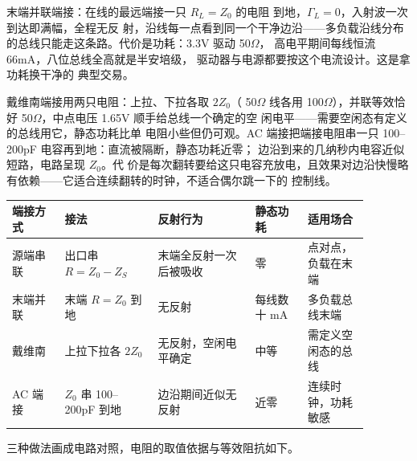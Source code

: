 末端并联端接：在线的最远端接一只 $R_L=Z_0$ 的电阻
到地，$\Gamma_L=0$，入射波一次到达即满幅，全程无反
射，沿线每一点看到同一个干净边沿——多负载沿线分布
的总线只能走这条路。代价是功耗：3.3V 驱动 50$\Omega$，
高电平期间每线恒流 66mA，八位总线全高就是半安培级，
驱动器与电源都要按这个电流设计。这是拿功耗换干净的
典型交易。

戴维南端接用两只电阻：上拉、下拉各取 $2Z_0$（
50$\Omega$ 线各用 100$\Omega$），并联等效恰好
50$\Omega$，中点电压 1.65V 顺手给总线一个确定的空
闲电平——需要空闲态有定义的总线用它，静态功耗比单
电阻小些但仍可观。AC 端接把端接电阻串一只
100--200pF 电容再到地：直流被隔断，静态功耗近零；
边沿到来的几纳秒内电容近似短路，电路呈现 $Z_0$。代
价是每次翻转要给这只电容充放电，且效果对边沿快慢略
有依赖——它适合连续翻转的时钟，不适合偶尔跳一下的
控制线。

\begin{longtable}{L{0.13\linewidth}L{0.23\linewidth}L{0.24\linewidth}L{0.13\linewidth}L{0.15\linewidth}}
\toprule
端接方式 & 接法 & 反射行为 & 静态功耗 & 适用场合 \\
\midrule
源端串联 & 出口串 $R=Z_0-Z_S$ & 末端全反射一次后被吸收 & 零 & 点对点，负载在末端 \\
末端并联 & 末端 $R=Z_0$ 到地 & 无反射 & 每线数十 mA & 多负载总线末端 \\
戴维南 & 上拉下拉各 $2Z_0$ & 无反射，空闲电平确定 & 中等 & 需定义空闲态的总线 \\
AC 端接 & $Z_0$ 串 100--200pF 到地 & 边沿期间近似无反射 & 近零 & 连续时钟，功耗敏感 \\
\bottomrule
\end{longtable}

三种做法画成电路对照，电阻的取值依据与等效阻抗如下。

